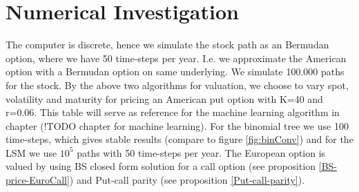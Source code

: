 \section{Numerical Investigation}



The computer is discrete, hence we simulate the stock path as an Bermudan option, where we have 50 time-steps per year. I.e. we approximate the American option with a Bermudan option on same underlying. 
 We simulate 100.000 paths for the stock.
By the above two algorithms for valuation, we choose to vary spot, volatility and maturity for pricing an American put option with K=40 and r=0.06. This table will serve as reference for the machine learning algorithm in chapter (!TODO chapter for machine learning). For the binomial tree we use 100 time-steps, which gives stable results (compare to figure \ref{fig:binConv}) and for the LSM we use $10^5$ paths with 50 time-steps per year. The European option is valued by using BS closed form solution for a call option (see proposition \ref{BS-price-EuroCall}) and Put-call parity (see proposition \ref{Put-call-parity}).
